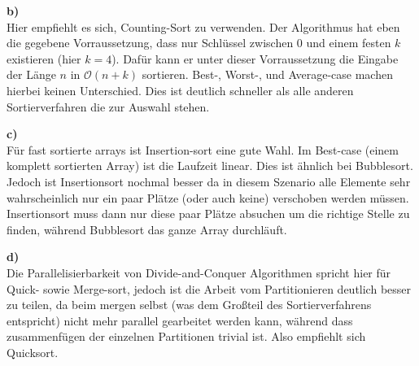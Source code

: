\documentclass[a4paper,graphics,11pt]{article}
\begin{document}
\textbf{b)}\\
Hier empfiehlt es sich, Counting-Sort zu verwenden. Der Algorithmus hat eben die gegebene Vorraussetzung, dass
nur Schlüssel zwischen 0 und einem festen $k$ existieren (hier $k=4$). Dafür kann er unter dieser Vorraussetzung
die Eingabe der Länge $n$ in $\mathcal{O}(n+k)$ sortieren. Best-, Worst-, und Average-case machen hierbei keinen Unterschied.
Dies ist deutlich schneller als alle anderen Sortierverfahren die zur Auswahl stehen.

\textbf{c)}\\
Für fast sortierte arrays ist Insertion-sort eine gute Wahl. Im Best-case (einem komplett sortierten Array)
ist die Laufzeit linear. Dies ist ähnlich bei Bubblesort. Jedoch ist Insertionsort nochmal besser da
in diesem Szenario alle Elemente sehr wahrscheinlich nur ein paar Plätze (oder auch keine) verschoben werden
müssen. Insertionsort muss dann nur diese paar Plätze absuchen um die richtige Stelle zu finden, während Bubblesort
das ganze Array durchläuft.

\textbf{d)}\\
Die Parallelisierbarkeit von Divide-and-Conquer Algorithmen spricht hier für Quick- sowie Merge-sort, jedoch
ist die Arbeit vom Partitionieren deutlich besser zu teilen, da beim mergen selbst (was dem Großteil des Sortierverfahrens entspricht)
nicht mehr parallel gearbeitet werden kann, während dass zusammenfügen der einzelnen Partitionen trivial ist.
Also empfiehlt sich Quicksort.
\end{document}
